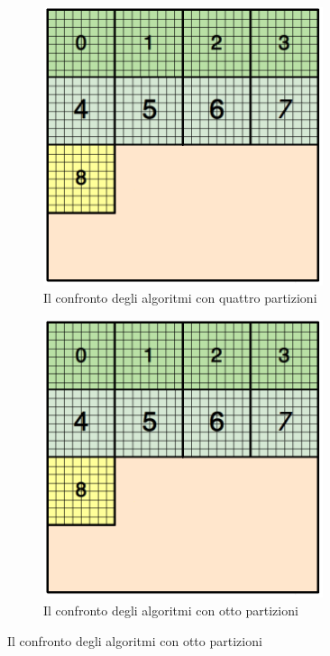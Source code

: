 {\begin{figure}[H]
\begin{subfigure}{1.0\textwidth}
		\centering
		\includegraphics[width=0.9\textwidth]{immagini/block_on_grid.png}
		\caption{Il confronto degli algoritmi con quattro partizioni\newline}
		\label{fig:confronto_4}
	\end{subfigure}
	\begin{subfigure}{1.0\textwidth}
		\centering
		\includegraphics[width=0.9\textwidth]{immagini/block_on_grid.png}
		\caption{Il confronto degli algoritmi con otto partizioni}
		\label{fig:confronto_8}
	\end{subfigure}


\end{figure}}
